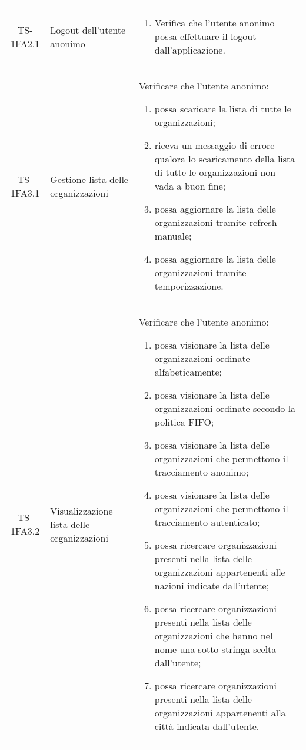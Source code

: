 {\begin{longtable}{ c | C{3cm} | C{11cm} }
TS-1FA2.1  & Logout dell'utente anonimo & \begin{enumerate}
    \item Verifica che l'utente anonimo possa effettuare il logout dall'applicazione.
\end{enumerate} \\

TS-1FA3.1 & Gestione lista delle organizzazioni &
Verificare che l'utente anonimo:
\begin{enumerate}
    \item possa scaricare la lista di tutte le organizzazioni;
    \item riceva un messaggio di errore qualora lo scaricamento della lista di tutte le organizzazioni non vada a buon fine;
    \item possa aggiornare la lista delle organizzazioni tramite refresh manuale;
    \item possa aggiornare la lista delle organizzazioni tramite temporizzazione.
\end{enumerate} \\

TS-1FA3.2 & Visualizzazione lista delle organizzazioni & 
Verificare che l'utente anonimo:
\begin{enumerate}
    \item possa visionare la lista delle organizzazioni ordinate alfabeticamente;
    \item possa visionare la lista delle organizzazioni ordinate secondo la politica FIFO;
    \item possa visionare la lista delle organizzazioni che permettono il tracciamento anonimo;
    \item possa visionare la lista delle organizzazioni che permettono il tracciamento autenticato;
    \item possa ricercare organizzazioni presenti nella lista delle organizzazioni appartenenti alle nazioni indicate dall'utente;
    \item possa ricercare organizzazioni presenti nella lista delle organizzazioni che hanno nel nome una sotto-stringa scelta dall'utente;
    \item possa ricercare organizzazioni presenti nella lista delle organizzazioni appartenenti alla città indicata dall'utente.
\end{enumerate} \\


\end{longtable}}
